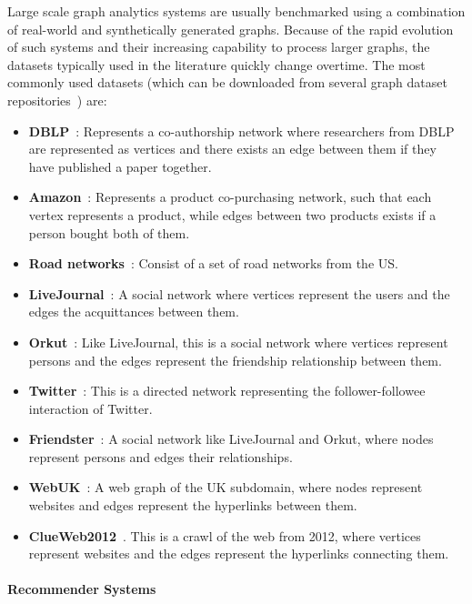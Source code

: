 Large scale graph analytics systems are usually benchmarked using a combination of
real-world and synthetically generated graphs. Because of the rapid evolution of such
systems and their increasing capability to process larger graphs, the datasets
typically used  in the literature quickly change overtime. The most commonly
used datasets (which can be downloaded from several graph dataset
repositories~\cite{snapnets,lawalgo}) are:
\begin{itemize}
  \item \textbf{DBLP}~\cite{yang2015defining}: Represents a co-authorship network where
    researchers from DBLP are represented as vertices and there exists an edge
    between them if they have published a paper together.
  \item \textbf{Amazon}~\cite{yang2015defining}: Represents a product co-purchasing
    network, such that each vertex represents a product, while edges between two products
    exists if a person bought both of them.
  \item \textbf{Road networks}~\cite{leskovec2009community}: Consist of a set of road
    networks from the US.
  \item \textbf{LiveJournal}~\cite{yang2015defining}: A social network where vertices
    represent the users and the edges the acquittances between them.
  \item \textbf{Orkut}~\cite{yang2015defining}: Like LiveJournal, this is a social network
    where vertices represent persons and the edges represent the friendship relationship between them.
  \item \textbf{Twitter}~\cite{kwak2010twitter}: This is a directed network representing
    the follower-followee interaction of Twitter.
  \item \textbf{Friendster}~\cite{yang2015defining}: A social network like LiveJournal and
    Orkut, where nodes represent persons and edges their relationships.
  \item \textbf{WebUK}~\cite{delis}: A web graph of the UK subdomain, where nodes represent
    websites and edges represent the hyperlinks between them.
  \item \textbf{ClueWeb2012}~\cite{clueweb}. This is a crawl of the web from 2012, where
    vertices represent websites and the edges represent the hyperlinks connecting them.
\end{itemize}

\paragraph{Recommender Systems}


